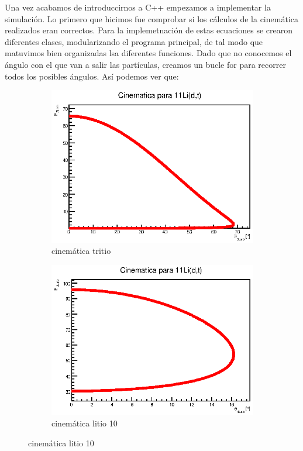 \documentclass[12pt,a4paper]{article}
\numberwithin{equation}{section}
\numberwithin{figure}{section}
\begin{document}
Una vez acabamos de introduccirnos a C++ empezamos a implementar la simulación. Lo primero que hicimos fue comprobar si los cálculos  de la cinemática realizados eran correctos. Para la implemetnación de estas ecuaciones se crearon diferentes clases, modularizando el programa principal, de tal modo que matuvimos bien organizadas lsa diferentes funciones. Dado que no conocemos el ángulo con el que van a salir las partículas, creamos un bucle for para recorrer todos los posibles ángulos. Así podemos ver que:  \\

\begin{figure}[h!] \centering
    \begin{subfigure}[b]{0.45\linewidth} \centering
        \includegraphics[scale=0.8]{CinematicaH.eps}
        \caption{cinemática tritio}
        \label{Fig:2.2.01-hidrogeno}
    \end{subfigure}
    \begin{subfigure}[b]{0.45\linewidth} \centering
        \includegraphics[scale=0.8]{Cinematica11Li.eps}
        \caption{cinemática litio 10}
        \label{Fig:2.2.01-litio}
    \end{subfigure}
\end{figure}
    
\end{document}
